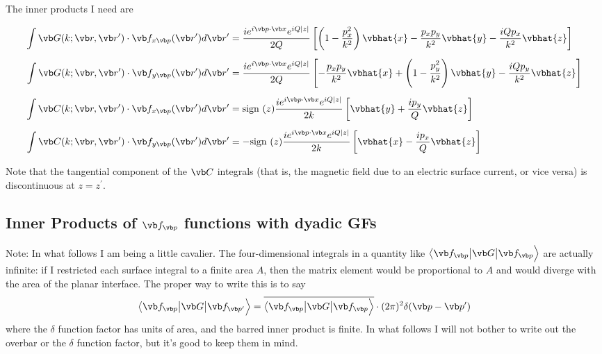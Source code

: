 \documentclass{article}
\newcommand{\vmv}[3]{ \big\langle #1 \big| #2 \big| #3 \Big\rangle}
\begin{document}
The inner products I need are 

\begin{align*}
 \int \vb G(k; \vb r, \vb r^\prime) \cdot \vb f_{x\vb p}(\vb r^\prime)
d\vb r^\prime
&=\frac{ ie^{i\vb p \cdot \vb x} e^{iQ|z|}}{2Q}
       \left[   \left(1-\frac{p_x^2}{k^2}\right) \vbhat{x}
               -\frac{p_x p_y}{k^2} \vbhat{y}
               -\frac{iQ p_x}{k^2} \vbhat{z}
       \right]
\\[5pt]
 \int \vb G(k; \vb r, \vb r^\prime) \cdot \vb f_{y\vb p}(\vb r^\prime)
d\vb r^\prime
&=\frac{ ie^{i\vb p \cdot \vb x} e^{iQ|z|}}{2Q}
       \left[  -\frac{p_x p_y}{k^2} \vbhat{x}
               +\left(1-\frac{p_y^2}{k^2} \right) \vbhat{y}  
               -\frac{iQ p_y}{k^2} \vbhat{z}
       \right]
\\[5pt]
 \int \vb C(k; \vb r, \vb r^\prime) \cdot \vb f_{x\vb p}(\vb r^\prime)
d\vb r^\prime
&=   \text{sign }(z)
   \frac{ ie^{i\vb p \cdot \vb x} e^{iQ|z|}}{2k}
   \left[ \vbhat{y} + \frac{ip_y}{Q} \vbhat{z} \right]
\\[5pt]
 \int \vb C(k; \vb r, \vb r^\prime) \cdot \vb f_{y\vb p}(\vb r^\prime)
d\vb r^\prime
&= - \text{sign }(z)
   \frac{ ie^{i\vb p \cdot \vb x} e^{iQ|z|}}{2k}
   \left[ \vbhat{x} - \frac{ip_x}{Q} \vbhat{z} \right]
\end{align*}

Note that the tangential component of the $\vb C$ integrals 
(that is, the magnetic field due to an electric surface current, 
or vice versa) is discontinuous at $z=z^\prime$.

\subsection{Inner Products of $\vb f_{\vb p}$ functions with dyadic GFs}

Note: In what follows I am being a little cavalier. The four-dimensional
integrals in a quantity like 
$\vmv{\vb f_{\vb p}}{\vb G}{\vb f_{\vb p}}$ are actually
infinite: if I restricted each surface integral to a finite 
area $A$, then the matrix element would be proportional to 
$A$ and would diverge with the area of the planar interface.
The proper way to write this is to say
$$  \vmv{\vb f_{\vb p}}{\vb G}{\vb f_{\vb p^\prime}}
  = \overline{\vmv{\vb f_{\vb p}}{\vb G}{\vb f_{\vb p}}}
    \cdot (2\pi)^2 \delta(\vb p-\vb p^\prime)
$$
where the $\delta$ function factor has units of area,
and the barred inner product is finite. In what follows I
will not bother to write out the overbar or the 
$\delta$ function factor, but it's good to keep them
in mind.
\end{document}

